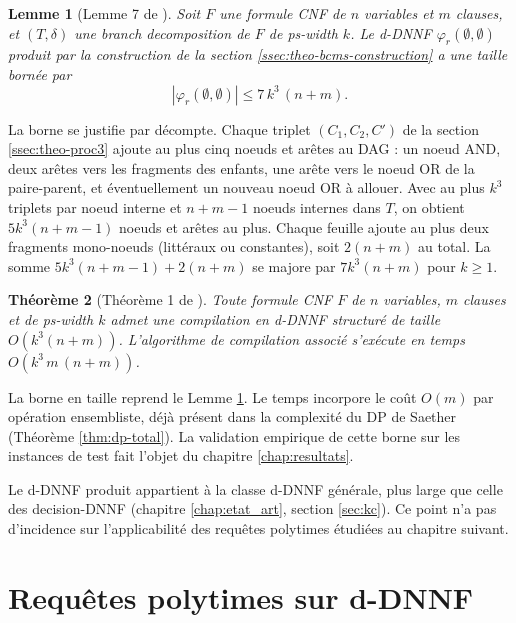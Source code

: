 \documentclass[11pt,a4paper]{report}
\theoremstyle{plain}
\newtheorem{theorem}{Théorème}[chapter]
\newtheorem{lemma}[theorem]{Lemme}
\theoremstyle{definition}
\begin{document}
\begin{lemma}[Lemme 7 de \cite{bova2015}]
\label{lem:bcms-size}
Soit $F$ une formule CNF de $n$ variables et $m$ clauses, et
$(T, \delta)$ une branch decomposition de $F$ de ps-width $k$. Le
d-DNNF $\varphi_r(\emptyset, \emptyset)$ produit par la construction
de la section \ref{ssec:theo-bcms-construction} a une taille bornée
par
\[
  |\varphi_r(\emptyset, \emptyset)| \leq 7\, k^3\, (n + m).
\]
\end{lemma}

La borne se justifie par décompte. Chaque triplet $(C_1, C_2, C')$ de
la section \ref{ssec:theo-proc3} ajoute au plus cinq noeuds et arêtes
au DAG : un noeud AND, deux arêtes vers les fragments des enfants, une
arête vers le noeud OR de la paire-parent, et éventuellement un nouveau
noeud OR à allouer. Avec au plus $k^3$ triplets par noeud interne et
$n + m - 1$ noeuds internes dans $T$, on obtient $5 k^3 (n + m - 1)$
noeuds et arêtes au plus. Chaque feuille ajoute au plus deux fragments
mono-noeuds (littéraux ou constantes), soit $2 (n + m)$ au total. La
somme $5 k^3 (n + m - 1) + 2 (n + m)$ se majore par $7 k^3 (n + m)$
pour $k \geq 1$.

\begin{theorem}[Théorème 1 de \cite{bova2015}]
\label{thm:bcms-main}
Toute formule CNF $F$ de $n$ variables, $m$ clauses et de ps-width $k$
admet une compilation en d-DNNF structuré de taille
$O(k^3 (n + m))$. L'algorithme de compilation associé s'exécute en
temps $O(k^3\, m\, (n + m))$.
\end{theorem}

La borne en taille reprend le Lemme \ref{lem:bcms-size}. Le temps
incorpore le coût $O(m)$ par opération ensembliste, déjà présent dans
la complexité du DP de Saether (Théorème \ref{thm:dp-total}). La
validation empirique de cette borne sur les instances de test fait
l'objet du chapitre \ref{chap:resultats}.

Le d-DNNF produit appartient à la classe d-DNNF générale, plus large
que celle des decision-DNNF
(chapitre \ref{chap:etat_art}, section \ref{sec:kc}). Ce point n'a
pas d'incidence sur l'applicabilité des requêtes polytimes étudiées
au chapitre suivant.

\section{Requêtes polytimes sur d-DNNF}
\label{sec:theo-queries}
\end{document}
